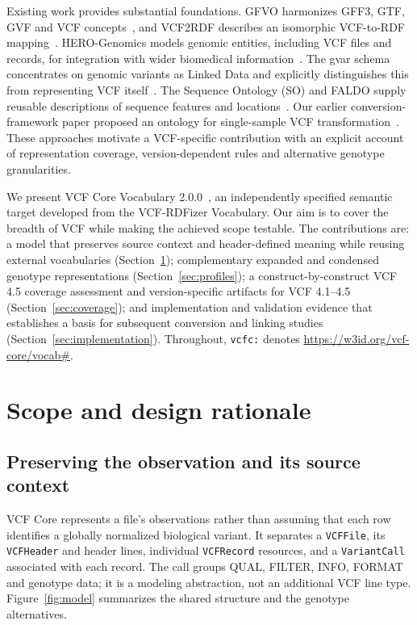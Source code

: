 \documentclass{ceurart}
\newcommand{\term}[1]{\texttt{#1}}
\begin{document}
Existing work provides substantial foundations. GFVO harmonizes GFF3, GTF, GVF and VCF concepts~\cite{baran2015gfvo}, and VCF2RDF describes an isomorphic VCF-to-RDF mapping~\cite{penha2017vcf2rdf}. HERO-Genomics models genomic entities, including VCF files and records, for integration with wider biomedical information~\cite{cazzaro2025hero}. The gvar schema concentrates on genomic variants as Linked Data and explicitly distinguishes this from representing VCF itself~\cite{gvar}. The Sequence Ontology (SO) and FALDO supply reusable descriptions of sequence features and locations~\cite{eilbeck2005so,bolleman2016faldo}. Our earlier conversion-framework paper proposed an ontology for single-sample VCF transformation~\cite{crum2025semantifying}. These approaches motivate a VCF-specific contribution with an explicit account of representation coverage, version-dependent rules and alternative genotype granularities.

We present VCF Core Vocabulary 2.0.0~\cite{vcfc200}, an independently specified semantic target developed from the VCF-RDFizer Vocabulary. Our aim is to cover the breadth of VCF while making the achieved scope testable. The contributions are: a model that preserves source context and header-defined meaning while reusing external vocabularies (Section~\ref{sec:design}); complementary expanded and condensed genotype representations (Section~\ref{sec:profiles}); a construct-by-construct VCF 4.5 coverage assessment and version-specific artifacts for VCF 4.1--4.5 (Section~\ref{sec:coverage}); and implementation and validation evidence that establishes a basis for subsequent conversion and linking studies (Section~\ref{sec:implementation}). Throughout, \term{vcfc:} denotes \url{https://w3id.org/vcf-core/vocab#}.

\section{Scope and design rationale}
\label{sec:design}

\subsection{Preserving the observation and its source context}

VCF Core represents a file's observations rather than assuming that each row identifies a globally normalized biological variant. It separates a \term{VCFFile}, its \term{VCFHeader} and header lines, individual \term{VCFRecord} resources, and a \term{VariantCall} associated with each record. The call groups QUAL, FILTER, INFO, FORMAT and genotype data; it is a modeling abstraction, not an additional VCF line type. Figure~\ref{fig:model} summarizes the shared structure and the genotype alternatives.
\end{document}
